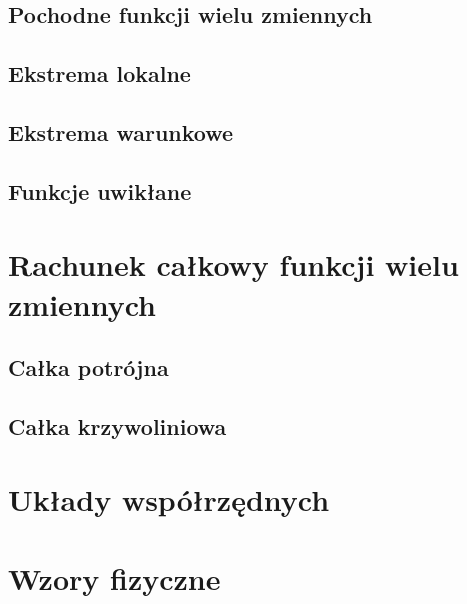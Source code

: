 \documentclass[11pt]{scrartcl}
\begin{document}
        \subsection{Pochodne funkcji wielu zmiennych}
        
        \subsection{Ekstrema lokalne}
        
        \subsection{Ekstrema warunkowe}
        
        \subsection{Funkcje uwikłane}
        

    \section{Rachunek całkowy funkcji wielu zmiennych}
    
        \subsection{Całka potrójna}
        
        \subsection{Całka krzywoliniowa}
        


    \appendix

    \section{Układy współrzędnych} \label{s:coordinate systems}
    

    \section{Wzory fizyczne} \label{s:physics formulas}
    
\end{document}
